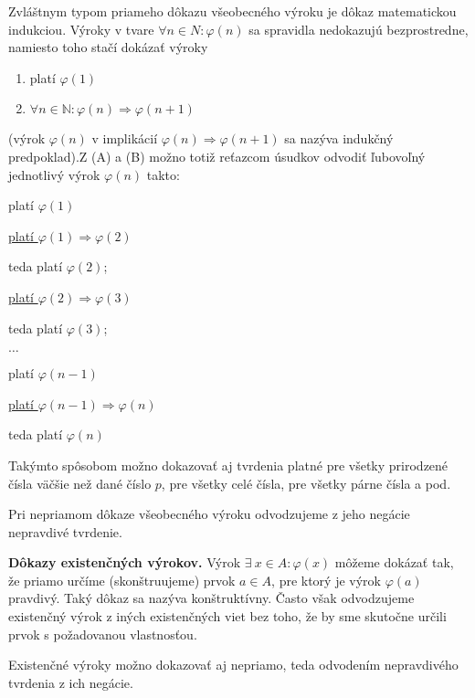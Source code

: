 Zvláštnym typom priameho dôkazu všeobecného výroku je dôkaz matematickou
indukciou. Výroky v tvare $\forall n \in N: \varphi (n)$ sa spravidla nedokazujú
bezprostredne, namiesto toho stačí dokázať výroky
\begin{enumerate}[label=(\Alph*)]
  \item platí $\varphi (1)$
  \item $\forall n \in \mathbb{N}: \varphi (n) \Rightarrow \varphi (n + 1)$
\end{enumerate}
(výrok $\varphi (n)$ v implikácií $\varphi (n) \Rightarrow \varphi (n + 1)$ sa
nazýva indukčný predpoklad).Z (A) a (B) možno totiž reťazcom úsudkov odvodiť
ľubovoľný jednotlivý výrok $\varphi (n)$ takto:

platí $\varphi (1)$

\underline{platí $\varphi (1) \Rightarrow \varphi (2)$}

\hspace{1em} teda platí $\varphi (2)$;

\hspace{3.2em} \underline{platí $\varphi(2) \Rightarrow \varphi(3)$}

\hspace{4.4em} teda platí $\varphi(3)$;

\hspace{5cm} $\ldots$

\hspace{6cm} platí $\varphi (n - 1)$

\hspace{6cm} \underline{platí $\varphi (n - 1) \Rightarrow \varphi (n)$}

\hspace{7.2cm} teda platí $\varphi (n)$

Takýmto spôsobom možno dokazovať aj tvrdenia platné pre všetky prirodzené čísla
väčšie než dané číslo $p$, pre všetky celé čísla, pre všetky párne čísla a pod.

Pri nepriamom dôkaze všeobecného výroku odvodzujeme z jeho negácie nepravdivé tvrdenie.

\textbf{Dôkazy existenčných výrokov.} Výrok $\exists ~ x \in A: \varphi (x)$
môžeme dokázať tak, že priamo určíme (skonštruujeme) prvok $a \in A$, pre ktorý
je výrok $\varphi (a)$ pravdivý. Taký dôkaz sa nazýva konštruktívny. Často však
odvodzujeme existenčný výrok z iných existenčných viet bez toho, že by sme
skutočne určili prvok s požadovanou vlastnosťou.

Existenčné výroky možno dokazovať aj nepriamo, teda odvodením nepravdivého
tvrdenia z ich negácie.

